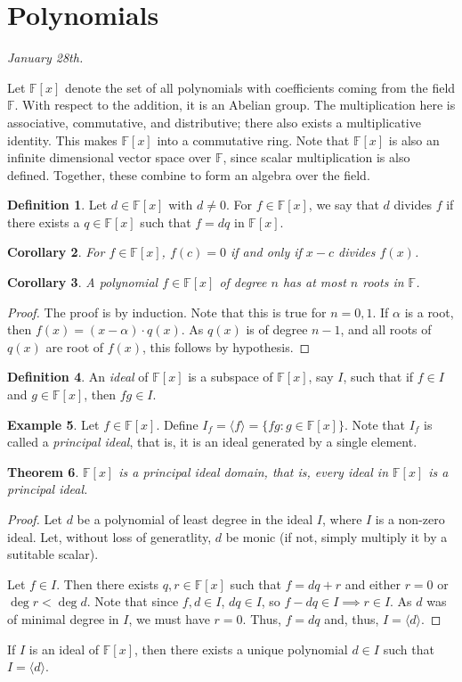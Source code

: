 \documentclass[15pt,a4paper]{book}
\newtheorem{theorem}{Theorem}[chapter]
\newtheorem{corollary}[theorem]{Corollary}
\theoremstyle{definition}
\newtheorem{definition}[theorem]{Definition}
\newtheorem{example}[theorem]{Example}
\newcommand{\eax}[1]{\emph{#1}\index{#1}} %
\newcommand{\F}{\mathbb{F}}
\begin{document}
\section{Polynomials}
\textit{January 28th.}

Let $\F[x]$ denote the set of all polynomials with coefficients coming from the field $\F$. With respect to the addition, it is an Abelian group. The multiplication here is associative, commutative, and distributive; there also exists a multiplicative identity. This makes $\F[x]$ into a commutative ring. Note that $\F[x]$ is also an infinite dimensional vector space over $\F$, since scalar multiplication is also defined. Together, these combine to form an algebra over the field.

\begin{definition}
    Let $d \in \F[x]$ with $d \neq 0$. For $f \in \F[x]$, we say that $d$ divides $f$ if there exists a $q \in \F[x]$ such that $f = dq$ in $\F[x]$.
\end{definition}
\begin{corollary}
    For $f \in \F[x]$, $f(c) = 0$ if and only if $x-c$ divides $f(x)$.
\end{corollary}
\begin{corollary}
    A polynomial $f \in \F[x]$ of degree $n$ has at most $n$ roots in $\F$.
\end{corollary}
\begin{proof}
    The proof is by induction. Note that this is true for $n = 0, 1$. If $\alpha$ is a root, then $f(x) = (x-\alpha) \cdot q(x)$. As $q(x)$ is of degree $n-1$, and all roots of $q(x)$ are root of $f(x)$, this follows by hypothesis.
\end{proof}

\begin{definition}
    An \eax{ideal} of $\F[x]$ is a subspace of $\F[x]$, say $I$, such that if $f \in I$ and $g \in \F[x]$, then $fg \in I$.
\end{definition}
\begin{example}
    Let $f \in \F[x]$. Define $I_{f} = \langle f\rangle = \{fg : g \in \F[x]\}$. Note that $I_{f}$ is called a \eax{principal ideal}, that is, it is an ideal generated by a single element.
\end{example}
\begin{theorem}
    $\F[x]$ is a principal ideal domain, that is, every ideal in $\F[x]$ is a principal ideal.
\end{theorem}
\begin{proof}
    Let $d$ be a polynomial of least degree in the ideal $I$, where $I$ is a non-zero ideal. Let, without loss of generatlity, $d$ be monic (if not, simply multiply it by a sutitable scalar).

    Let $f \in I$. Then there exists $q,r \in \F[x]$ such that $f = dq + r$ and either $r = 0$ or $\deg r < \deg d$. Note that since $f,d \in I$, $dq \in I$, so $f-dq \in I \implies r \in I$. As $d$ was of minimal degree in $I$, we must have $r = 0$. Thus, $f = dq$ and, thus, $I = \langle d \rangle$.
\end{proof}
If $I$ is an ideal of $\F[x]$, then there exists a unique polynomial $d \in I$ such that $I = \langle d \rangle$.
\end{document}

